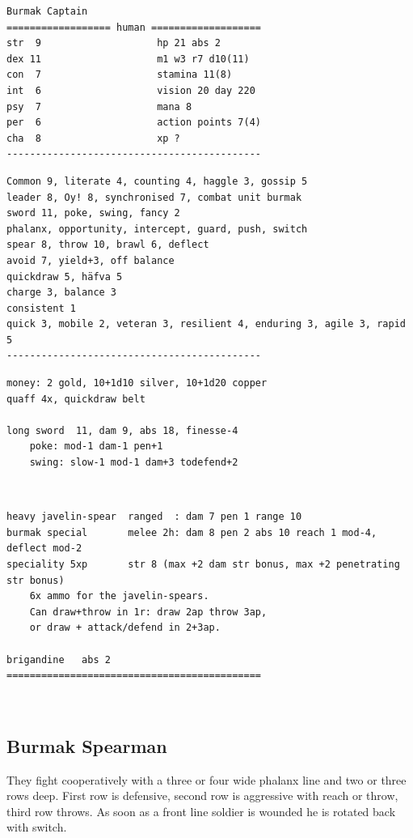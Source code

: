 \goodbreak \small \begin{samepage} \begin{verbatim}
Burmak Captain
================== human ===================
str  9                    hp 21 abs 2
dex 11                    m1 w3 r7 d10(11)
con  7                    stamina 11(8)
int  6                    vision 20 day 220
psy  7                    mana 8
per  6                    action points 7(4)
cha  8                    xp ?
--------------------------------------------
\end{verbatim} \goodbreak \begin{verbatim}
Common 9, literate 4, counting 4, haggle 3, gossip 5
leader 8, Oy! 8, synchronised 7, combat unit burmak
sword 11, poke, swing, fancy 2
phalanx, opportunity, intercept, guard, push, switch
spear 8, throw 10, brawl 6, deflect
avoid 7, yield+3, off balance
quickdraw 5, häfva 5
charge 3, balance 3
consistent 1
quick 3, mobile 2, veteran 3, resilient 4, enduring 3, agile 3, rapid 5
--------------------------------------------
\end{verbatim} \goodbreak \begin{verbatim}
money: 2 gold, 10+1d10 silver, 10+1d20 copper
quaff 4x, quickdraw belt

long sword  11, dam 9, abs 18, finesse-4
    poke: mod-1 dam-1 pen+1
    swing: slow-1 mod-1 dam+3 todefend+2
\end{verbatim} \end{samepage}   \   \goodbreak \begin{samepage} \begin{verbatim}
heavy javelin-spear  ranged  : dam 7 pen 1 range 10
burmak special       melee 2h: dam 8 pen 2 abs 10 reach 1 mod-4, deflect mod-2
speciality 5xp       str 8 (max +2 dam str bonus, max +2 penetrating str bonus)
    6x ammo for the javelin-spears. 
    Can draw+throw in 1r: draw 2ap throw 3ap, 
    or draw + attack/defend in 2+3ap.

brigandine   abs 2
============================================
\end{verbatim} \end{samepage} \normalsize

\


\subsection*{Burmak Spearman}

They fight cooperatively with a three or four wide phalanx line and two or three rows deep. First row is defensive, second row is aggressive with reach or throw, third row throws. As soon as a front line soldier is wounded he is rotated back with switch.

